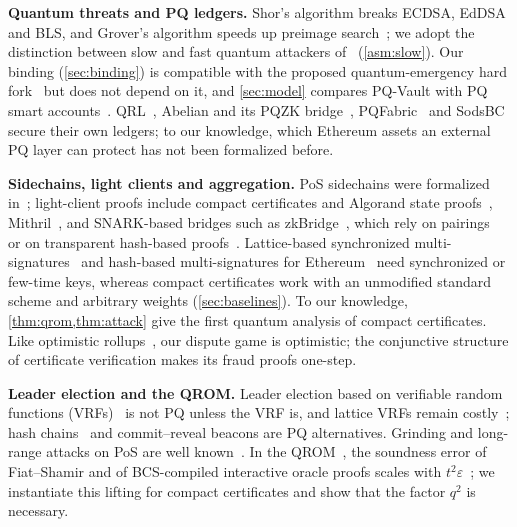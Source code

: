 \documentclass[10pt,journal,compsoc]{IEEEtran}
\theoremstyle{tplain}
\theoremstyle{tdef}
\theoremstyle{remark}
\begin{document}
\noindent\textbf{Quantum threats and PQ ledgers.} Shor's algorithm breaks ECDSA, EdDSA and BLS, and Grover's algorithm speeds up preimage search~\cite{aggarwal2018quantum}; we adopt the distinction between slow and fast quantum attackers of~\cite{stewart2018committing} (\cref{asm:slow}). Our binding (\cref{sec:binding}) is compatible with the proposed quantum-emergency hard fork~\cite{buterin2024emergency} but does not depend on it, and \cref{sec:model} compares PQ-Vault with PQ smart accounts~\cite{zknox_dilithium,zknox_falcon}. QRL~\cite{QRL}, Abelian and its PQZK bridge~\cite{abelian_website,abelian_bridge}, PQFabric~\cite{Refblock14} and SodsBC~\cite{cryptoeprint:2020/205} secure their own ledgers; to our knowledge, which Ethereum assets an external PQ layer can protect has not been formalized before.

\noindent\textbf{Sidechains, light clients and aggregation.} PoS sidechains were formalized in~\cite{gazi2019pos}; light-client proofs include compact certificates and Algorand state proofs~\cite{micali2020compact,algorand_stateproofs}, Mithril~\cite{chaidos2021mithril}, and SNARK-based bridges such as zkBridge~\cite{xie2022zkbridge}, which rely on pairings~\cite{groth16} or on transparent hash-based proofs~\cite{Virgo_conf,bcs2016}. Lattice-based synchronized multi-signatures~\cite{fleischhacker2023chipmunk} and hash-based multi-signatures for Ethereum~\cite{drake2025hashsig} need synchronized or few-time keys, whereas compact certificates work with an unmodified standard scheme and arbitrary weights (\cref{sec:baselines}). To our knowledge, \cref{thm:qrom,thm:attack} give the first quantum analysis of compact certificates. Like optimistic rollups~\cite{kalodner2018arbitrum}, our dispute game is optimistic; the conjunctive structure of certificate verification makes its fraud proofs one-step.

\noindent\textbf{Leader election and the QROM.} Leader election based on verifiable random functions (VRFs)~\cite{gilad2017algorand,david2018praos} is not PQ unless the VRF is, and lattice VRFs remain costly~\cite{esgin2021lbvrf}; hash chains~\cite{QRL} and commit--reveal beacons are PQ alternatives. Grinding and long-range attacks on PoS are well known~\cite{kiayias2017ouroboros,gazi2018stakebleeding}. In the QROM~\cite{boneh2011qrom}, the soundness error of Fiat--Shamir and of BCS-compiled interactive oracle proofs scales with $t^2\varepsilon$~\cite{don2019fs,chiesa2019qrom}; we instantiate this lifting for compact certificates and show that the factor $q^2$ is necessary.
\end{document}
